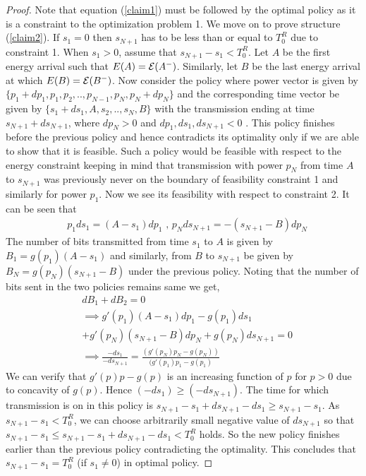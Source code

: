\begin{proof}
Note that equation (\ref{claim1}) must be followed by the optimal policy as it is a constraint to the optimization problem 1. We move on to prove structure (\ref{claim2}). If $s_1=0$ then $s_{N+1}$ has to be less than or equal to $T^R_0$ due to constraint 1. When $s_1>0$, assume that $s_{N+1}-s_1<T^R_0$. Let $A$ be the first energy arrival such that $E(A)=\mathcal{E}(A^-)$. Similarly, let $B$ be the last energy arrival at which $E(B)=\mathcal{E}(B^-)$. Now consider the policy where power vector is given by $\{p_1+dp_1,p_1,p_2,..,p_{N-1},p_N,p_N+dp_N \}$ and the corresponding time vector be given by $\{s_1+ds_1,A,s_2,..,s_{N},B\}$ with the transmission ending at time $s_{N+1}+ds_{N+1}$, where $dp_N>0$ and  $dp_1,ds_1, ds_{N+1}<0$ . This policy finishes before the previous policy and hence contradicts its optimality only if we are able to show that it is feasible. Such a policy would be feasible with respect to the energy constraint keeping in mind that transmission with power $p_N$ from time $A$ to $s_{N+1}$ was previously never on the boundary of feasibility constraint 1 and similarly for power $p_1$. Now we see its feasibility with respect to constraint 2. It can be seen that
\begin{align}
&p_1ds_1=(A-s_1)dp_1\text{ , }p_Nds_{N+1}=-(s_{N+1}-B)dp_N
\end{align}
The number of bits transmitted from time $s_1$ to $A$ is given by $B_1=g(p_1)(A-s_1)$ and similarly, from $B$ to $s_{N+1}$ be given by $B_N=g(p_N)(s_{N+1}-B)$ under the previous policy. Noting that the number of bits sent in the two policies remains same we get,
\begin{align}
&\nonumber dB_1+dB_2=0
\\
&\nonumber\implies g'(p_1)(A-s_1)dp_1-g(p_1)ds_1
\\
&\nonumber +g'(p_N)(s_{N+1}-B)dp_N+g(p_N)ds_{N+1}=0
\\
&\nonumber\implies \frac{-ds_1}{-ds_{N+1}}=\frac{(g'(p_N)p_N-g(p_N))}{(g'(p_1)p_1-g(p_1)}
\end{align}
We can verify that $g'(p)p-g(p)$ is an increasing function of $p$ for $p>0$ due to concavity of $g(p)$. Hence $(-ds_1)\ge (-ds_{N+1})$. The time for which transmission is on in this policy is $s_{N+1}-s_1+ds_{N+1}-ds_1\ge s_{N+1}-s_1$. As $s_{N+1}-s_1<T^R_0$, we can choose arbitrarily small negative value of $ds_{N+1}$ so that $s_{N+1}-s_1\le s_{N+1}-s_1+ds_{N+1}-ds_1<T^R_0$ holds. So the new policy finishes earlier than the previous policy contradicting the optimality. This concludes that $s_{N+1}-s_1=T^R_0$ (if $s_1\neq 0$) in optimal policy.


\end{proof}
